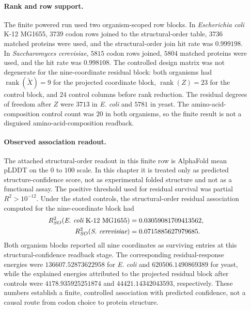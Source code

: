 \paragraph{Rank and row support.}
The finite powered run used two organism-scoped row blocks.  In \emph{Escherichia coli} K-12 MG1655, $3739$ codon rows joined to the structural-order table, $3736$ matched proteins were used, and the structural-order join hit rate was $0.999198$.  In \emph{Saccharomyces cerevisiae}, $5815$ codon rows joined, $5804$ matched proteins were used, and the hit rate was $0.998108$.  The controlled design matrix was not degenerate for the nine-coordinate residual block: both organisms had $\operatorname{rank}(\widetilde X)=9$ for the projected coordinate block, $\operatorname{rank}(Z)=23$ for the control block, and $24$ control columns before rank reduction.  The residual degrees of freedom after $Z$ were $3713$ in \emph{E. coli} and $5781$ in yeast.  The amino-acid-composition control count was $20$ in both organisms, so the finite result is not a disguised amino-acid-composition readback.

\paragraph{Observed association readout.}
The attached structural-order readout in this finite row is AlphaFold mean pLDDT on the $0$ to $100$ scale.  In this chapter it is treated only as predicted structure-confidence score, not as experimental folded structure and not as a functional assay.  The positive threshold used for residual survival was partial $R^2>10^{-12}$.  Under the stated controls, the structural-order residual association computed for the nine-coordinate block had
$$
\begin{aligned}
R^2_{SO}(\emph{E. coli}\ \mathrm{K\mbox{-}12\ MG1655}) &= 0.03059081709413562,\\
R^2_{SO}(\emph{S. cerevisiae}) &= 0.0715885627979685.
\end{aligned}
$$
Both organism blocks reported all nine coordinates as surviving entries at this structural-confidence readback stage.  The corresponding residual-response energies were $136607.52873622958$ for \emph{E. coli} and $620506.1490869389$ for yeast, while the explained energies attributed to the projected residual block after controls were $4178.935925251874$ and $44421.14342043593$, respectively.  These numbers establish a finite, controlled association with predicted confidence, not a causal route from codon choice to protein structure.


